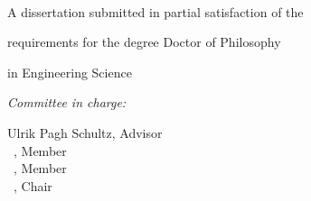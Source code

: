 \begin{titlepage}
	\centering
	{\large \publisher\par}
	~

	\vspace{28pt}
	{\Huge{}\selectfont\bfseries\booktitle\par}
	\vspace{24pt}

	{\Large{}\selectfont\authorname\par}
	\vspace{24pt}

	{\large A dissertation submitted in partial satisfaction of the\par\vspace*{.8ex}
	requirements for the degree Doctor of Philosophy\par\vspace*{.8ex}
	in Engineering Science}
	\vspace{42pt}

	{\begin{flushleft}{\itshape Committee in charge:}
		\begin{multicols}{2}
			{Ulrik Pagh Schultz, Advisor\\\vspace*{.8ex}
			~, Member\\\vspace*{.8ex}%
			~, Member\\\vspace*{.8ex}%
			~, Chair\\%
			}\par
			\columnbreak
			{~\\
			~\\
			~}\par
		\end{multicols}
		\vspace{6pt}
		\begin{multicols}{2}
		~\\\columnbreak {\itshape %
		                }
		\end{multicols}	
	\end{flushleft}}

	{\large \editionyear{}}
\end{titlepage}

